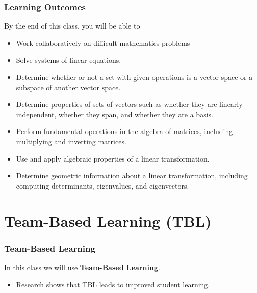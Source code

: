 \documentclass[aspectration=1610]{beamer}
\begin{document}
\begin{frame} \frametitle{Learning Outcomes }
By the end of this class, you will be able to
\begin{itemize}
\item Work collaboratively on difficult mathematics problems
\pause \item Solve systems of linear equations.
\pause \item Determine whether or not a set with given operations is a vector space or a subspace of another vector space.
\pause \item Determine properties of sets of vectors such as whether they are linearly independent, whether they span, and whether they are a basis.
\pause \item Perform fundamental operations in the algebra of matrices, including multiplying and inverting matrices.
\pause \item Use and apply algebraic properties of a linear transformation.
\pause \item Determine geometric information about a linear transformation, including computing determinants, eigenvalues, and eigenvectors.
\end{itemize}
\end{frame}





  \section{Team-Based Learning (TBL)}

  \begin{frame}\frametitle{Team-Based Learning}
  In this class we will use {\bf Team-Based Learning}.
  \begin{itemize}
    \item Research shows that TBL leads to improved student learning.
  \end{itemize}

\begin{center}
\end{center}  

  \end{frame}
  
\end{document}
